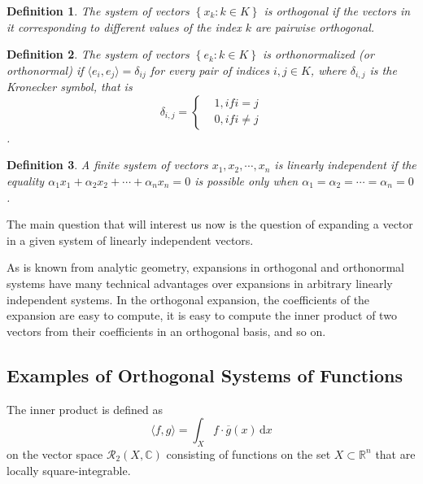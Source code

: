 \documentclass[a4paper,12pt]{article}
\newtheorem{definition}{Definition}[section]
\begin{document}
    \begin{definition}
        \emph{
        The system of vectors $\left\{x_k: k \in K \right\}$ is orthogonal if the
        vectors in it corresponding to different values of the index $k$
        are pairwise orthogonal.
        }
    \end{definition}

    \begin{definition}
        \emph{
        The system of vectors $\left\{e_k: k \in K \right\}$ is orthonormalized (or orthonormal)
        if $\langle e_i, e_j \rangle = \delta_{ij}$ for every pair of indices $i,j \in K$,
        where $\delta_{i,j}$ is the  Kronecker  symbol, that is  
        \[
        \delta_{i,j}  =  \left\{\begin{array}{cr}  & 1, if i=j \\ & 0, if i \ne j 
        \end{array} \right.
        \].
        }
    \end{definition}

    \begin{definition}
        \emph{
        A finite system of vectors $x_1, x_2, \cdots , x_n$ is linearly independent 
        if the equality $\alpha_1x_1 + \alpha_2x_2 + \cdots + \alpha_nx_n = 0$ is possible 
        only when $\alpha_1 = \alpha_2 = \cdots = \alpha_n = 0$.
        }
    \end{definition}

    The main question that will interest us now is the question of expanding
    a vector in a given system of linearly independent vectors.

    As is known from analytic geometry, expansions in orthogonal and 
    orthonormal systems have many technical advantages over expansions 
    in arbitrary linearly independent systems. In the orthogonal expansion, 
    the coefficients of the expansion are easy to compute, it is easy to 
    compute the inner product of two vectors from their coefficients in 
    an orthogonal basis, and so on.


    \subsection{Examples of Orthogonal Systems of Functions}
    The inner product is defined as 
    \begin{equation}
        \langle f, g \rangle = \int_X f \cdot \overline{g}(x)\, \mathrm{d}x
        \label{eq:eq1}
    \end{equation}
    on the vector space $\mathcal{R}_2(X, \mathbb{C})$ consisting of functions 
    on the set $X \subset \mathbb{R}^n$ that are locally square-integrable.
\end{document}
